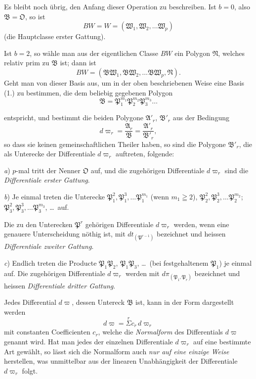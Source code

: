 \documentclass{article}
\begin{document}
Es bleibt noch übrig, den Anfang dieser Operation zu beschreiben. Ist $b = 0$, also $\mathfrak{B} = \mathfrak{O}$, so ist
\[ BW = W = (\mathfrak{W}_{1}, \mathfrak{W}_{2}, \ldots \mathfrak{W}_{p}) \]
(die Hauptclasse erster Gattung).

Ist $b = 2$, so wähle man aus der eigentlichen Classe $BW$ ein Polygon $\mathfrak{N}$, welches relativ prim zu $\mathfrak{B}$ ist; dann ist
\[ BW = (\mathfrak{B}\mathfrak{W}_{1}, \mathfrak{B}\mathfrak{W}_{2}, \ldots \mathfrak{B}\mathfrak{W}_{p}, \mathfrak{N}). \]
Geht man von dieser Basis aus, um in der oben beschriebenen Weise eine Basis (1.) zu bestimmen, die dem beliebig gegebenen Polygon
\[ \mathfrak{B} = \mathfrak{P}_{1}^{m_{1}}\mathfrak{P}_{2}^{m_{2}}\mathfrak{P}_{3}^{m_{3}}\ldots \]

entspricht, und bestimmt die beiden Polygone $\mathfrak{A}'_{r}$, $\mathfrak{B}'_{r}$ aus der Bedingung
\[ d\varpi_{r} = \frac{\mathfrak{A}_{r}}{\mathfrak{B}} = \frac{\mathfrak{A}'_{r}}{\mathfrak{B}'_{r}}, \]
so dass sie keinen gemeinschaftlichen Theiler haben, so sind die Polygone $\mathfrak{B}'_{r}$, die als Unterecke der Differentiale $d\varpi_{r}$ auftreten, folgende:

\emph{a}) $p$-mal tritt der Nenner $\mathfrak{O}$ auf, und die zugehörigen Differentiale $d\varpi_{r}$ sind die \emph{Differentiale erster Gattung}.

\emph{b}) Je einmal treten die Unterecke $\mathfrak{P}_{1}^{2}, \mathfrak{P}_{1}^{3}, \ldots \mathfrak{P}_{1}^{m_{1}}$ (wenn $m_{1} \geqq 2$), $\mathfrak{P}_{2}^{2}, \mathfrak{P}_{2}^{3}, \ldots \mathfrak{P}_{2}^{m_{2}}$; $\mathfrak{P}_{3}^{2}, \mathfrak{P}_{3}^{3}, \ldots \mathfrak{P}_{3}^{m_{3}}$, \ldots\ auf.

Die zu den Unterecken $\mathfrak{P}^{r}$ gehörigen Differentiale $d\varpi_{r}$ werden, wenn eine genauere Unterscheidung nöthig ist, mit $dt_{(\mathfrak{P}^{r-1})}$ bezeichnet und heissen \emph{Differentiale zweiter Gattung}.

\emph{c}) Endlich treten die Producte $\mathfrak{P}_{1}\mathfrak{P}_{2}$, $\mathfrak{P}_{1}\mathfrak{P}_{3}$, \ldots\ (bei festgehaltenem $\mathfrak{P}_{1}$) je einmal auf. Die zugehörigen Differentiale $d\varpi_{r}$ werden mit $d\pi_{(\mathfrak{P}_{1}, \mathfrak{P}_{r})}$ bezeichnet und heissen \emph{Differentiale dritter Gattung}.

Jedes Differential $d\varpi$, dessen Untereck $\mathfrak{B}$ ist, kann in der Form dargestellt werden
\[ d\varpi = \overset{r}{\Sigma} c_{r}\,d\varpi_{r} \tag{3.} \]
mit constanten Coefficienten $c_{r}$, welche die \emph{Normalform} des Differentials $d\varpi$ genannt wird. Hat man jedes der einzelnen Differentiale $d\varpi_{r}$ auf eine bestimmte Art gewählt, so lässt sich die Normalform auch \emph{nur auf eine einzige Weise} herstellen, was unmittelbar aus der linearen Unabhängigkeit der Differentiale $d\varpi_{r}$ folgt.
\end{document}
